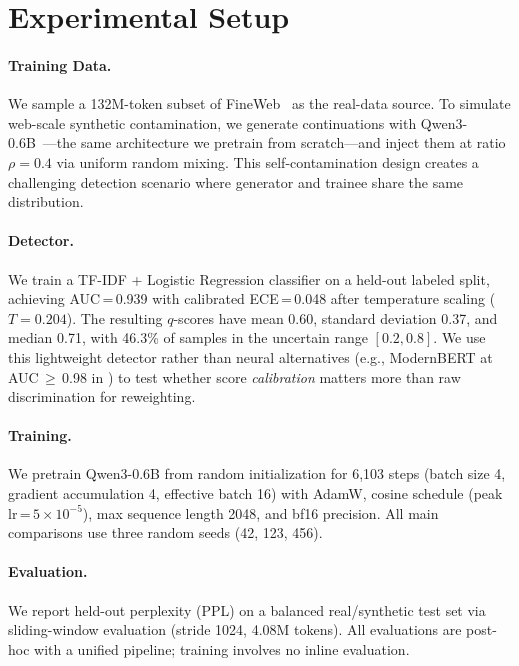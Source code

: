 \section{Experimental Setup}
\label{sec:experiments}

\paragraph{Training Data.}
We sample a 132M-token subset of FineWeb~\citep{penedo_2024_fineweb} as the real-data source.
To simulate web-scale synthetic contamination, we generate continuations with Qwen3-0.6B~\citep{yang_2025_qwen3}---the same architecture we pretrain from scratch---and inject them at ratio $\rho = 0.4$ via uniform random mixing.
This self-contamination design creates a challenging detection scenario where generator and trainee share the same distribution.

\paragraph{Detector.}
We train a TF-IDF + Logistic Regression classifier on a held-out labeled split, achieving AUC\,=\,0.939 with calibrated ECE\,=\,0.048 after temperature scaling ($T = 0.204$).
The resulting $q$-scores have mean 0.60, standard deviation 0.37, and median 0.71, with 46.3\% of samples in the uncertain range $[0.2, 0.8]$.
We use this lightweight detector rather than neural alternatives (e.g., ModernBERT at AUC\,${\geq}$\,0.98 in \citealt{drayson_2025_detection_collapse}) to test whether score \emph{calibration} matters more than raw discrimination for reweighting.

\paragraph{Training.}
We pretrain Qwen3-0.6B from random initialization for 6{,}103 steps (batch size 4, gradient accumulation 4, effective batch 16) with AdamW, cosine schedule (peak lr\,=\,$5{\times}10^{-5}$), max sequence length 2048, and bf16 precision.
All main comparisons use three random seeds (42, 123, 456).

\paragraph{Evaluation.}
We report held-out perplexity (PPL) on a balanced real/synthetic test set via sliding-window evaluation (stride 1024, 4.08M tokens).
All evaluations are post-hoc with a unified pipeline; training involves no inline evaluation.

